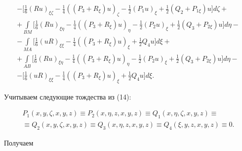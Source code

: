 \begin{gather*}
%


-\bigg[ \frac{1}{6} (Ru)_{\xi\zeta}-\frac{1}{4}


((P_3 +R_\xi)u)_\zeta -\frac{1}{2}


(P_1 u)_\xi +\frac{1}{2} (Q_2+P_{1\xi})u \bigg] d\zeta + \\


%


+\int\limits_{BM} \bigg[


\frac{1}{6} (Ru)_{\xi\eta}-\frac{1}{4}


((P_3 +R_\xi)u)_\eta -\frac{1}{2} (P_2 u)_\xi


+\frac{1}{2} (Q_3 +P_{2\xi})u \bigg] d\eta - \\


%


-\int\limits_{MA}


\bigg[ \frac{1}{6} (uR)_{\xi\xi} -\frac{1}{4}


((P_3 +R_\xi)u)_\xi +\frac{1}{2} Q_4 u\bigg] d\xi + \\


%


+\int\limits_{AB} \bigg[


\frac{1}{6} (Ru)_{\xi\eta}-\frac{1}{4}


((P_3 +R_\xi)u)_\eta -\frac{1}{2} (P_2 u)_\xi


+\frac{1}{2} (Q_3 +P_{2\xi})u \bigg] d\eta - \\


%


-\bigg[ \frac{1}{6} (uR)_{\xi\xi} -\frac{1}{4}


((P_3 +R_\xi)u)_\xi +\frac{1}{2} Q_4 u\bigg] d\xi.


\end{gather*}


Учитываем следующие тождества из (14):


\begin{multline*}


P_{1}(x,y,\zeta,x,y,z)\equiv P_{2}(x,\eta,z,x,y,z)\equiv


Q_{1}(x,\eta,\zeta,x,y,z)\equiv\\


\equiv Q_{2}(x,y,\zeta,x,y,z)\equiv Q_{3}(x,\eta,z,x,y,z)


\equiv Q_{4}(\xi,y,z,x,y,z)\equiv 0.


\end{multline*}


Получаем


